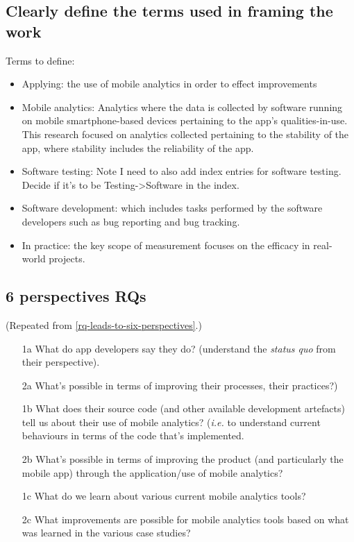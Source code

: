 \subsection{Clearly define the terms used in framing the work}
Terms to define:  
\begin{itemize}
    \item Applying: the use of mobile analytics in order to effect improvements
    \item Mobile analytics: Analytics where the data is collected by software running on mobile smartphone-based devices pertaining to the app's qualities-in-use. This research focused on analytics collected pertaining to the stability of the app, where stability includes the reliability of the app.
    \item Software testing: Note I need to also add index entries for software testing. Decide if it's to be Testing->Software in the index.
    \item Software development: which includes tasks performed by the software developers such as bug reporting and bug tracking. 
    \item In practice: the key scope of measurement focuses on the efficacy in real-world projects.
\end{itemize}

\subsection{6 perspectives RQs}
(Repeated from \ref{rq-leads-to-six-perspectives}.)

\begin{kaobox}[frametitle=The six perspectives from Chapter 1]
\begin{enumerate}
    \item [1a] What do app developers say they do? (understand the \emph{status quo} from their perspective).
    \item [2a] What's possible in terms of improving their processes, their practices?)
    \item [1b] What does their source code (and other available development artefacts) tell us about their use of mobile analytics? (\emph{i.e.} to understand current behaviours in terms of the code that's implemented.
    \item [2b] What's possible in terms of improving the product (and particularly the mobile app) through the application/use of mobile analytics?
    \item [1c] What do we learn about various current mobile analytics tools?
    \item [2c] What improvements are possible for mobile analytics tools based on what was learned in the various case studies?
\end{enumerate}    
\end{kaobox}

